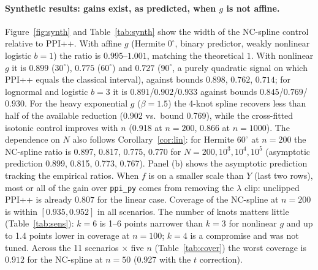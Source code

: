 \documentclass{article}
\begin{document}
\paragraph{Synthetic results: gains exist, as predicted, when $g$ is not affine.}
Figure~\ref{fig:synth} and Table~\ref{tab:synth} show the width of the NC-spline control relative to PPI++. With affine $g$ (Hermite $0^\circ$, binary predictor, weakly nonlinear logistic $b{=}1$) the ratio is $0.995$--$1.001$, matching the theoretical $1$. With nonlinear $g$ it is $0.899$ ($30^\circ$), $0.775$ ($60^\circ$) and $0.727$ ($90^\circ$, a purely quadratic signal on which PPI++ equals the classical interval), against bounds $0.898$, $0.762$, $0.714$; for lognormal and logistic $b{=}3$ it is $0.891$/$0.902$/$0.933$ against bounds $0.845$/$0.769$/$0.930$. For the heavy exponential $g$ ($\beta=1.5$) the 4-knot spline recovers less than half of the available reduction (0.902 vs.\ bound 0.769), while the cross-fitted isotonic control improves with $n$ (0.918 at $n=200$, 0.866 at $n=1000$). The dependence on $N$ also follows Corollary~\ref{cor:lin}: for Hermite $60^\circ$ at $n=200$ the NC-spline ratio is 0.897, 0.817, 0.775, 0.770 for $N=200,10^3,10^4,10^5$ (asymptotic prediction 0.899, 0.815, 0.773, 0.767). Panel (b) shows the asymptotic prediction tracking the empirical ratios. When $f$ is on a smaller scale than $Y$ (last two rows), most or all of the gain over \texttt{ppi\_py} comes from removing the $\lambda$ clip: unclipped PPI++ is already $0.807$ for the linear case. Coverage of the NC-spline at $n=200$ is within $[0.935,0.952]$ in all scenarios. The number of knots matters little (Table~\ref{tab:sens}): $k=6$ is 1--6 points narrower than $k=3$ for nonlinear $g$ and up to 1.4 points lower in coverage at $n=100$; $k=4$ is a compromise and was not tuned. Across the 11 scenarios $\times$ five $n$ (Table~\ref{tab:cover}) the worst coverage is $0.912$ for the NC-spline at $n=50$ (0.927 with the $t$ correction).

\begin{table}[t]
\centering\small
\caption{Synthetic scenarios, $n=200$, $N=10^4$, $R=2000$: mean CI width divided by that of PPI++ (\texttt{ppi\_py}); columns PPI, PPI++ unclip., NC-spline ($k{=}4$) and CF-iso are empirical; Bound is the asymptotic efficiency bound $\sqrt{V_\star/V_{\rm PPI++}}$; last two columns: empirical coverage (nominal 0.95).}\label{tab:synth}

\end{table}

\begin{table}[t]
\centering\small
\caption{Sensitivity to the number of spline knots $k$: width ratio to PPI++ (\texttt{ppi\_py}) at $n=200$, coverage at $n=100$ ($N=10^4$, $R=2000$); Bound as in Table~\ref{tab:synth}. The last row averages the seven real datasets with continuous scores.}\label{tab:sens}
\resizebox{\linewidth}{!}{}
\end{table}
\end{document}
